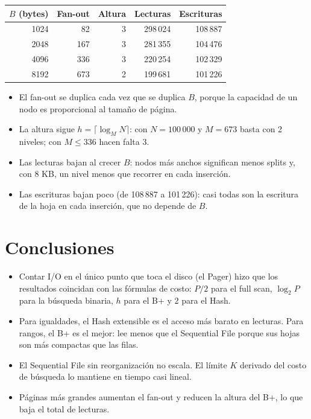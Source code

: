 \documentclass[11pt,a4paper]{article}
\begin{document}
\begin{center}
\begin{tabular}{rrrrr}
\toprule
$B$ (bytes) & Fan-out & Altura & Lecturas & Escrituras \\
\midrule
1024 & 82 & 3 & 298\,024 & 108\,887 \\
2048 & 167 & 3 & 281\,355 & 104\,476 \\
4096 & 336 & 3 & 220\,254 & 102\,329 \\
8192 & 673 & 2 & 199\,681 & 101\,226 \\
\bottomrule
\end{tabular}
\end{center}

\begin{itemize}
  \item El fan-out se duplica cada vez que se duplica $B$, porque la capacidad de un
        nodo es proporcional al tamaño de página.
  \item La altura sigue $h = \lceil \log_M N \rceil$: con $N = 100\,000$ y $M = 673$
        basta con 2 niveles; con $M \le 336$ hacen falta 3.
  \item Las lecturas bajan al crecer $B$: nodos más anchos significan menos splits y,
        con 8 KB, un nivel menos que recorrer en cada inserción.
  \item Las escrituras bajan poco (de 108\,887 a 101\,226): casi todas son la
        escritura de la hoja en cada inserción, que no depende de $B$.
\end{itemize}

\section{Conclusiones}

\begin{itemize}
  \item Contar I/O en el único punto que toca el disco (el Pager) hizo que los
        resultados coincidan con las fórmulas de costo: $P/2$ para el full scan,
        $\log_2 P$ para la búsqueda binaria, $h$ para el B+ y 2 para el Hash.
  \item Para igualdades, el Hash extensible es el acceso más barato en lecturas. Para
        rangos, el B+ es el mejor: lee menos que el Sequential File porque sus hojas son
        más compactas que las filas.
  \item El Sequential File sin reorganización no escala. El límite $K$ derivado del
        costo de búsqueda lo mantiene en tiempo casi lineal.
  \item Páginas más grandes aumentan el fan-out y reducen la altura del B+, lo que
        baja el total de lecturas.
\end{itemize}
\end{document}
